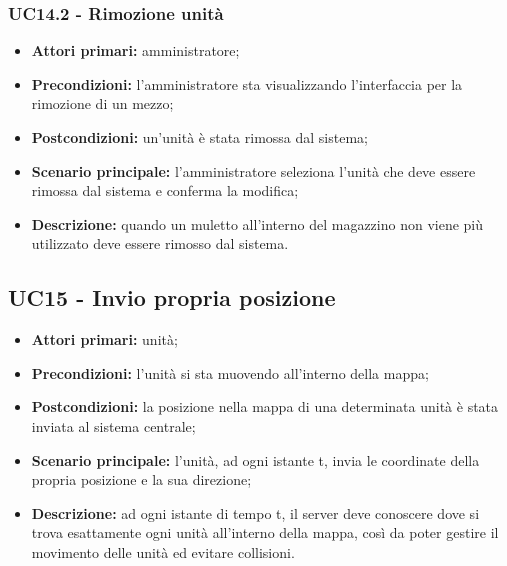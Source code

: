 \subsubsection{UC14.2 - Rimozione unità}
\begin{itemize}
	\item 	\textbf{Attori primari:} amministratore;
	\item 	\textbf{Precondizioni:} l'amministratore sta visualizzando l'interfaccia per la rimozione di un mezzo;
	\item 	\textbf{Postcondizioni:} un'unità è stata rimossa dal sistema;
	\item 	\textbf{Scenario principale:} l'amministratore seleziona l'unità che deve essere rimossa dal sistema e conferma la modifica;
	\item 	\textbf{Descrizione:} quando un muletto all'interno del magazzino non viene più utilizzato deve essere rimosso dal sistema.
	
\end{itemize}

\subsection{UC15 - Invio propria posizione}
\begin{itemize}
	\item 	\textbf{Attori primari:} unità;
	\item 	\textbf{Precondizioni:} l'unità si sta muovendo all'interno della mappa;
	\item 	\textbf{Postcondizioni:} la posizione nella mappa di una determinata unità è stata inviata al sistema centrale;
	\item 	\textbf{Scenario principale:} l'unità, ad ogni istante t, invia le coordinate della propria posizione e la sua direzione;
	\item 	\textbf{Descrizione:} ad ogni istante di tempo t, il server deve conoscere dove si trova esattamente ogni unità all'interno della mappa, così da poter gestire il movimento delle unità ed evitare collisioni.
	
\end{itemize}

